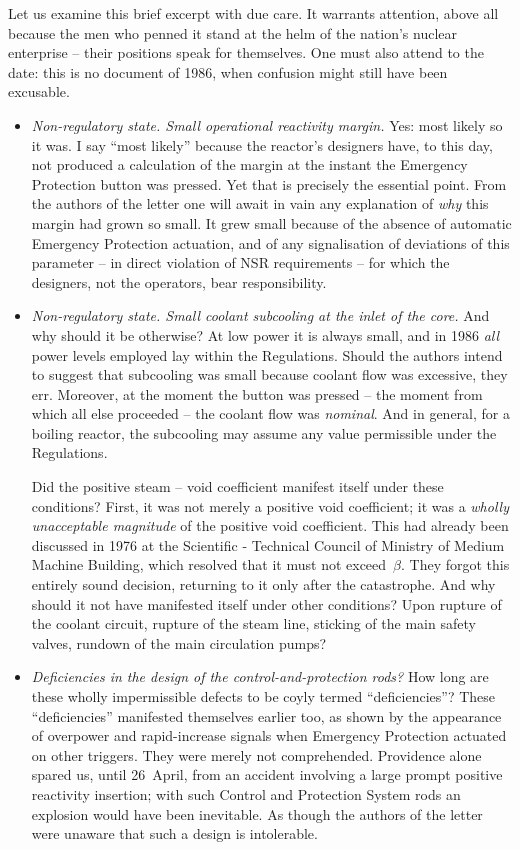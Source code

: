 \documentclass[openright]{bookest}
\begin{document}
Let us examine this brief excerpt with due care. It warrants attention, above all because the men who penned it stand at the helm of the nation's nuclear enterprise -- their positions speak for themselves. One must also attend to the date: this is no document of 1986, when confusion might still have been excusable.

\begin{itemize}
\item \textit{Non-regulatory state. Small operational reactivity margin.} Yes: most likely so it was. I say ``most likely'' because the reactor's designers have, to this day, not produced a calculation of the margin at the instant the Emergency Protection button was pressed. Yet that is precisely the essential point. From the authors of the letter one will await in vain any explanation of \textit{why} this margin had grown so small. It grew small because of the absence of automatic Emergency Protection actuation, and of any signalisation of deviations of this parameter -- in direct violation of NSR requirements -- for which the designers, not the operators, bear responsibility.

\item \textit{Non-regulatory state. Small coolant subcooling at the inlet of the core.} And why should it be otherwise? At low power it is always small, and in 1986 \textit{all} power levels employed lay within the Regulations. Should the authors intend to suggest that subcooling was small because coolant flow was excessive, they err. Moreover, at the moment the button was pressed -- the moment from which all else proceeded -- the coolant flow was \textit{nominal}. And in general, for a boiling reactor, the subcooling may assume any value permissible under the Regulations.

Did the positive steam -- void coefficient manifest itself under these conditions? First, it was not merely a positive void coefficient; it was a \textit{wholly unacceptable magnitude} of the positive void coefficient. This had already been discussed in 1976 at the Scientific - Technical Council of Ministry of Medium Machine Building, which resolved that it must not exceed~$\beta$. They forgot this entirely sound decision, returning to it only after the catastrophe. And why should it not have manifested itself under other conditions? Upon rupture of the coolant circuit, rupture of the steam line, sticking of the main safety valves, rundown of the main circulation pumps?

\item \textit{Deficiencies in the design of the control-and-protection rods?} How long are these wholly impermissible defects to be coyly termed ``deficiencies''? These ``deficiencies'' manifested themselves earlier too, as shown by the appearance of overpower and rapid-increase signals when Emergency Protection actuated on other triggers. They were merely not comprehended. Providence alone spared us, until 26~April, from an accident involving a large prompt positive reactivity insertion; with such Control and Protection System rods an explosion would have been inevitable. As though the authors of the letter were unaware that such a design is intolerable.


\end{itemize}
\end{document}

